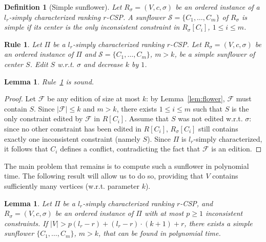 \documentclass[11pt]{article}
\newtheorem{definition}[theorem]{Definition}
\newtheorem{lemma}[theorem]{Lemma}
\newtheorem{polyrule}{Rule}[section]
\begin{document}
\begin{definition}[Simple sunflower]
\label{def:simplesunflower}
	 Let $R_\sigma = (V, c, \sigma)$ be an ordered instance of a $l_r$-simply 
	 characterized ranking $r$-CSP. A sunflower $\mathcal{S} = \{C_1, \ldots, C_m\}$ of 
	 $R_\sigma$ is \emph{simple} if its center is the only inconsistent constraint in $R_\sigma[C_i]$, $1 \leqslant i \leqslant m$.
	 
\end{definition}

\begin{polyrule}
\label{rule:correct}
	Let $\Pi$ be a $l_r$-simply  characterized ranking $r$-CSP. Let $R_\sigma = (V, c, \sigma)$ be an ordered instance of $\Pi$ 
	and $\mathcal{S} = \{C_1, \ldots, C_m\}$, $m > k$, be a simple sunflower of center $S$. 
	Edit $S$ w.r.t. $\sigma$ and decrease $k$ by $1$.
\end{polyrule}

\begin{lemma}
\label{lem:correct}
	Rule~\ref{rule:correct} is sound. 

\end{lemma}

\begin{proof}
	Let $\mathcal{F}$ be any edition of size at most $k$: by Lemma~\ref{lem:flower}, $\mathcal{F}$ must contain $S$. Since $|\mathcal{F}| \leqslant k$ and $m > k$, there exists $1 \leqslant i \leqslant m$ such that $S$ is the only constraint edited by $\mathcal{F}$ in $R[C_i]$. Assume that $S$ was not edited w.r.t. $\sigma$: since no other constraint has been edited in $R[C_{i}]$, $R_\sigma[C_i]$ still contains exactly one inconsistent constraint (namely $S$). Since $\Pi$ is $l_r$-simply characterized, it follows that $C_{i}$ defines a conflict, contradicting the fact that $\mathcal{F}$ is an edition.
 \end{proof}

The main problem that remains is to compute such a sunflower in polynomial time. The following result will allow us to do so, providing that $V$ contains sufficiently many vertices (w.r.t. parameter $k$). 

\begin{lemma}
	\label{lem:correctSC}
	Let $\Pi$ be a $l_r$-simply characterized ranking $r$-CSP, and $R_\sigma = (V, c, \sigma)$ be an ordered instance of $\Pi$ with at most $p \geqslant 1$ inconsistent constraints. If $|V| > p(l_r - r) + (l_r - r) \cdot (k+1) + r$, there exists a simple sunflower $\{C_1, \ldots, C_m\}$, $m > k$, that can be found in polynomial time.
\end{lemma}
\end{document}
